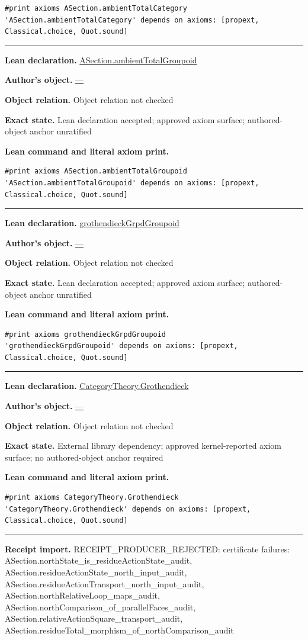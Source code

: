 \documentclass[11pt]{article}
\theoremstyle{plain}
\theoremstyle{definition}
\theoremstyle{remark}
\begin{document}
\begin{tcolorbox}
\begin{Verbatim}[breaklines=true,breakanywhere=true,fontsize=\small]
#print axioms ASection.ambientTotalCategory
'ASection.ambientTotalCategory' depends on axioms: [propext, Classical.choice, Quot.sound]
\end{Verbatim}
\medskip\hrule\medskip
\textbf{Lean declaration.} \url{ASection.ambientTotalGroupoid}
\par\textbf{Author's object.} \url{—}
\par\textbf{Object relation.} Object relation not checked
\par\textbf{Exact state.} Lean declaration accepted; approved axiom surface; authored-object anchor unratified
\par\smallskip\textbf{Lean command and literal axiom print.}
\begin{Verbatim}[breaklines=true,breakanywhere=true,fontsize=\small]
#print axioms ASection.ambientTotalGroupoid
'ASection.ambientTotalGroupoid' depends on axioms: [propext, Classical.choice, Quot.sound]
\end{Verbatim}
\medskip\hrule\medskip
\textbf{Lean declaration.} \url{grothendieckGrpdGroupoid}
\par\textbf{Author's object.} \url{—}
\par\textbf{Object relation.} Object relation not checked
\par\textbf{Exact state.} Lean declaration accepted; approved axiom surface; authored-object anchor unratified
\par\smallskip\textbf{Lean command and literal axiom print.}
\begin{Verbatim}[breaklines=true,breakanywhere=true,fontsize=\small]
#print axioms grothendieckGrpdGroupoid
'grothendieckGrpdGroupoid' depends on axioms: [propext, Classical.choice, Quot.sound]
\end{Verbatim}
\medskip\hrule\medskip
\textbf{Lean declaration.} \url{CategoryTheory.Grothendieck}
\par\textbf{Author's object.} \url{—}
\par\textbf{Object relation.} Object relation not checked
\par\textbf{Exact state.} External library dependency; approved kernel-reported axiom surface; no authored-object anchor required
\par\smallskip\textbf{Lean command and literal axiom print.}
\begin{Verbatim}[breaklines=true,breakanywhere=true,fontsize=\small]
#print axioms CategoryTheory.Grothendieck
'CategoryTheory.Grothendieck' depends on axioms: [propext, Classical.choice, Quot.sound]
\end{Verbatim}
\medskip\hrule\medskip
\textbf{Receipt import.} \textcolor{KgtRed}{RECEIPT\_PRODUCER\_REJECTED: certificate failures: ASection.northState\_is\_residueActionState\_audit, ASection.residueActionState\_north\_input\_audit, ASection.residueActionTransport\_north\_input\_audit, ASection.northRelativeLoop\_maps\_audit, ASection.northComparison\_of\_parallelFaces\_audit, ASection.relativeActionSquare\_transport\_audit, ASection.residueTotal\_morphism\_of\_northComparison\_audit}
\end{tcolorbox}
\end{document}
